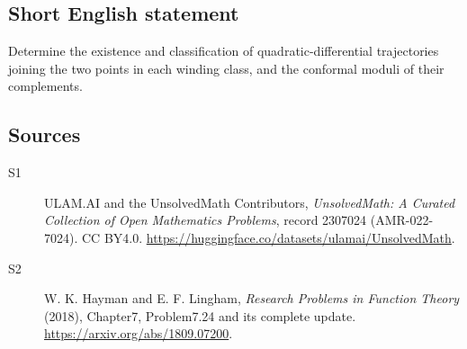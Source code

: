 \documentclass[11pt]{article}
\begin{document}
\subsection{Short English statement}
Determine the existence and classification of quadratic-differential trajectories joining the two points in each winding class, and the conformal moduli of their complements.
\subsection{Sources}
\begin{description}
\item[\hypertarget{source:2307024:1}{S1}] ULAM.AI and the UnsolvedMath Contributors, \emph{UnsolvedMath: A Curated Collection of Open Mathematics Problems}, record 2307024 (AMR-022-7024). CC BY4.0. \url{https://huggingface.co/datasets/ulamai/UnsolvedMath}.
\item[\hypertarget{source:2307024:2}{S2}] W. K. Hayman and E. F. Lingham, \emph{Research Problems in Function Theory} (2018), Chapter7, Problem7.24 and its complete update. \url{https://arxiv.org/abs/1809.07200}.
\end{description}
\label{end:2307024}
\end{document}

